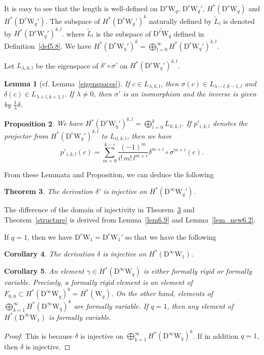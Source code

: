 \documentclass[12pt]{amsart}
\newcommand{\W}{\mathrm{W}}
\newcommand{\D}{\mathrm{D}}
\newtheorem{theorem}{Theorem}[section]
\newtheorem{corollary}[theorem]{Corollary}
\newtheorem{proposition}[theorem]{Proposition}
\newtheorem{lemma}[theorem]{Lemma}
\theoremstyle{definition}
\theoremstyle{remark}
\begin{document}
It is easy to see that the length is well-defined on $\D^r\W_q$, $\D^r\W_q'$, $H^*(\D^r\W_q)$ and $H^*(\D^r\W_q')$.
The subspace of $H^*(\D^r\W_q')^k$ naturally defined by $\widetilde{L}_l$ is denoted by $H^*(\D^r\W_q')^{k,l}$. where $\widetilde{L}_l$ is the subspace of $\widetilde{\D^r\W_q}$ defined in Definition~\ref{def5.8}.
We have $H^*(\D^r\W_q')^k=\bigoplus_{l=0}^{\infty}H^*(\D^r\W_q')^{k,l}$.

Let $L_{\lambda,k,l}$ be the eigenspace of $\delta'\circ\sigma'$ on $H^*(\D^r\W_q')^{k,l}$.

\begin{lemma}[cf. Lemma~\ref{eigenspaces}]
If $c\in L_{\lambda,k,l}$, then $\sigma(c)\in L_{\lambda-l,k-1,l}$ and $\delta(c)\in L_{\lambda+l,k+1,l}$.
If $\lambda\neq0$, then $\sigma'$ is an isomorphism and the inverse is given by $\frac1{\lambda}\delta$.
\end{lemma}

\begin{proposition}
We have $H^*(\D^r\W_q')^{k,l}=\bigoplus_{i=0}^kL_{il,k,l}$.
If $p'_{i,k,l}$ denotes the projector from $H^*(\D^r\W_q')^{k,l}$ to $L_{il,k,l}$, then we have
\[
p'_{i,k,l}(c)=\sum_{m=0}^{k-i}\frac{(-1)^m}{i!\,m!\,l^{m+i}}\delta^{m+i}\circ\sigma^{m+i}(c).
\]
\end{proposition}

From these Lemmata and Proposition, we can deduce the following

\begin{theorem}
\label{thm9.11}
The derivation $\delta'$ is injective on $H^*(\D^\infty\W_q')$.
\end{theorem}
The difference of the domain of injectivity in Theorem~\ref{thm9.11} and Theorem~\ref{structure} is derived from Lemma~\ref{lem6.9} and Lemma~\ref{lem_new6.2}.

If $q=1$, then we have $\D^r\W_1=\D^r\W_1'$ so that we have the following

\begin{corollary}
\label{cor9.16}
The derivation $\delta$ is injective on $H^*(\D^\infty\W_1)$.
\end{corollary}

\begin{corollary}
\label{cor8.8}
An element $\gamma\in H^*(\D^\infty\W_q)$ is either formally rigid or formally variable.
Precisely, a formally rigid element is an element of $F_{0,0}\subset H^*(\D^\infty\W_q)^0=H^*(\W_q)$.
On the other hand, elements of \/$\bigoplus_{k=1}^{\infty}H^*(\D^\infty\W_q)^k$ are formally variable.
If $q=1$, then any element of $H^*(\D^\infty\W_1)$ is formally variable.
\end{corollary}
\begin{proof}
This is because $\delta$ is injective on $\bigoplus_{k=1}^{\infty}H^*(\D^\infty\W_q)^k$.
If in addition $q=1$, then $\delta$ is injective.
\end{proof}
\end{document}
